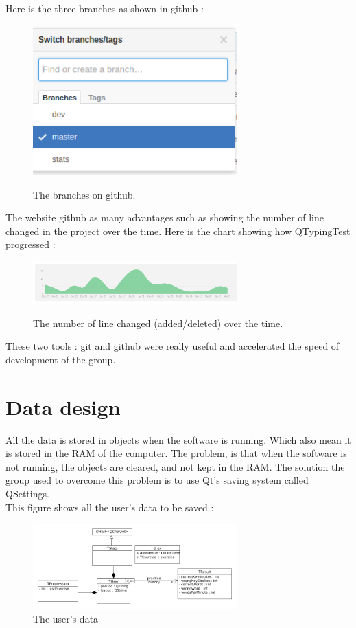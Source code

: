 Here is the three branches as shown in github :
\begin{figure}[H]
	\centering
	\includegraphics[width=0.7\textwidth]{images/github-branches.png}
	\label{github-branches}
	\caption{The branches on github.}
\end{figure}

The website github as many advantages such as showing the number of line changed in the project over the time. Here is the chart showing how QTypingTest progressed :
\begin{figure}[H]
	\centering
	\includegraphics[width=0.7\textwidth]{images/github-progression.png}
	\label{github-chart}
	\caption{The number of line changed (added/deleted) over the time.}
\end{figure}

These two tools : git and github were really useful and accelerated the speed of development of the group.

\chapter{Data design}
All the data is stored in objects when the software is running. Which also mean it is stored in the RAM of the computer.
The problem, is that when the software is not running, the objects are cleared, and not kept in the RAM. The solution the group used to overcome this problem is to use Qt's saving system called QSettings.\\
This figure shows all the user's data to be saved :

\begin{figure}[H]
	\centering
	\includegraphics[width=0.7\textwidth]{images/diagram-data.png}
	 \caption{The user's data}
	 \label{diagram-data}
\end{figure}

